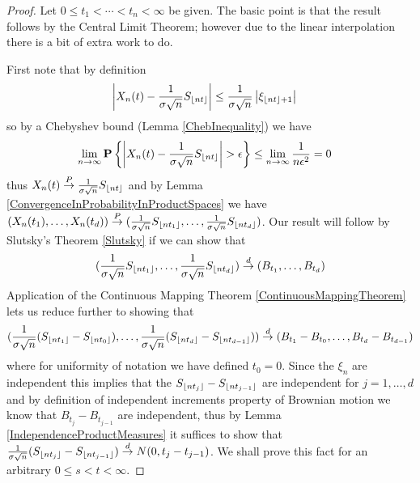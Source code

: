\begin{proof}
Let $0 \leq t_1 < \dotsb < t_n < \infty$ be given.  The basic point is
that the result follows by the Central Limit Theorem; however due to
the linear interpolation there is a bit of extra work to do.

First note that by definition 
\begin{align*}
\left \vert X_n(t) - \frac{1}{\sigma \sqrt{n}} S_{\left \lfloor nt \right \rfloor}  \right \vert
&\leq  \frac{1}{\sigma \sqrt{n}}\left \vert \xi_{\left \lfloor nt \right \rfloor+1} \right \vert
\end{align*}
so by a Chebyshev bound (Lemma \ref{ChebInequality}) we have
\begin{align*}
\lim_{n \to \infty} \textbf{P}\left \{\left \vert X_n(t) - \frac{1}{\sigma
      \sqrt{n}} S_{\left \lfloor nt \right \rfloor}  \right \vert > \epsilon \right \}
&\leq  \lim_{n \to \infty} \frac{1}{n\epsilon^2} = 0
\end{align*}
thus $X_n(t)  \overset{P}\to \frac{1}{\sigma\sqrt{n}} S_{\left \lfloor nt \right \rfloor}$ and by
Lemma \ref{ConvergenceInProbabilityInProductSpaces}
we have $(X_n(t_1), \dotsc, X_n(t_d)) \overset{P}\to (\frac{1}{\sigma\sqrt{n}}
S_{\left \lfloor nt_1 \right \rfloor}, \dotsc, \frac{1}{\sigma\sqrt{n}}
S_{\left \lfloor nt_d \right \rfloor})$.  Our result will follow by Slutsky's Theorem
\ref{Slutsky} if we can show that
\begin{align*}
(\frac{1}{\sigma\sqrt{n}}
S_{\left \lfloor nt_1 \right \rfloor}, \dotsc, \frac{1}{\sigma\sqrt{n}}S_{\left \lfloor nt_d \right \rfloor}) \overset{d}\to (B_{t_1}, \dotsc, B_{t_d})
\end{align*}
Application of the Continuous Mapping Theorem
\ref{ContinuousMappingTheorem} lets us reduce further to showing that 
\begin{align*}
(\frac{1}{\sigma\sqrt{n}}(S_{\left \lfloor nt_1 \right \rfloor} -
S_{\left \lfloor nt_0 \right \rfloor}), \dotsc, \frac{1}{\sigma\sqrt{n}}
(S_{\left \lfloor nt_d \right \rfloor}- S_{\left \lfloor nt_{d-1} \right \rfloor}))\overset{d}\to (B_{t_1} - B_{t_0}, \dotsc, B_{t_d} - B_{t_{d-1}})
\end{align*}
where for uniformity of notation we have defined $t_0 = 0$.  Since the
$\xi_n$ are independent this implies that the $S_{\left \lfloor nt_j \right \rfloor}-
S_{\left \lfloor nt_{j-1} \right \rfloor}$ are independent for $j=1, \dotsc, d$ and by
definition of independent increments property of Brownian motion we
know that $B_{t_j} - B_{t_{j-1}}$ are independent, thus by Lemma \ref{IndependenceProductMeasures} it suffices to
show that $\frac{1}{\sigma\sqrt{n}} (S_{\left \lfloor nt_j \right \rfloor}-S_{\left \lfloor nt_{j-1} \right \rfloor}) \overset{d}\to N(0, t_j -
t_{j-1})$.  We shall prove this fact for an arbitrary $0 \leq s < t < \infty$.


\end{proof}

